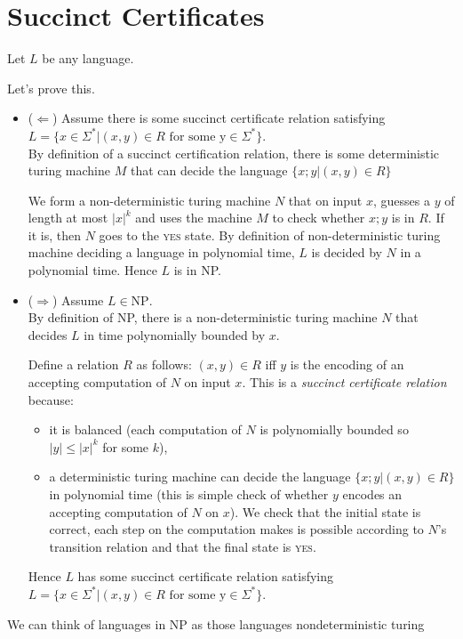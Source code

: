 \frmrule



\section{Succinct Certificates}



Let $L$ be any language. 

Let's prove this.
\begin{itemize}   
\renewcommand{\labelitemi}{$\Box$}
\item ($\Leftarrow$) Assume there is some succinct certificate relation satisfying
$L = \{x \in \Sigma^{*} | (x,y) \in R \text{ for some y} \in \Sigma^{*}\}$.\\
By definition of a succinct certification relation, 
there is some deterministic turing machine $M$ that 
can decide the language $\{x;y | (x,y) \in R\}$

We form a non-deterministic turing machine $N$ that on input $x$, 
guesses a $y$ of length at most $|x|^k$ and uses the machine
$M$ to check whether $x;y$ is in $R$. If it is, then $N$ 
goes to the \textsc{yes} state. 
By definition of non-deterministic turing machine 
deciding a language in polynomial time, $L$ 
is decided by $N$ in a polynomial time. Hence $L$ is in NP.

\item ($\Rightarrow$) Assume $L \in \text{NP}$. \\
By definition of NP, there is a non-deterministic turing machine 
$N$ that decides $L$ in time polynomially bounded by $x$. 

Define a relation $R$ as follows: $(x, y) \in R$ iff $y$ is the 
encoding of an accepting computation of $N$ on input $x$. 
This is a \textit{succinct certificate relation} because:
\begin{itemize} 
\item it is balanced (each computation of $N$ is polynomially bounded so $|y| \leqslant |x|^k$ 
for some $k$), 
\item a deterministic turing machine can decide the language $\{x;y | (x,y) \in R\}$
in polynomial time (this is simple check of whether $y$ 
encodes an accepting computation of $N$ on $x$). We check that 
the initial state is correct, each step on the computation makes is possible 
according to $N$'s transition relation and that the final state is \textsc{yes}. 
\end{itemize}
Hence $L$ has some succinct certificate relation satisfying
$L = \{x \in \Sigma^{*} | (x,y) \in R \text{ for some y} \in \Sigma^{*}\}$.
\end{itemize}


We can think of languages in NP as those languages  nondeterministic turing 